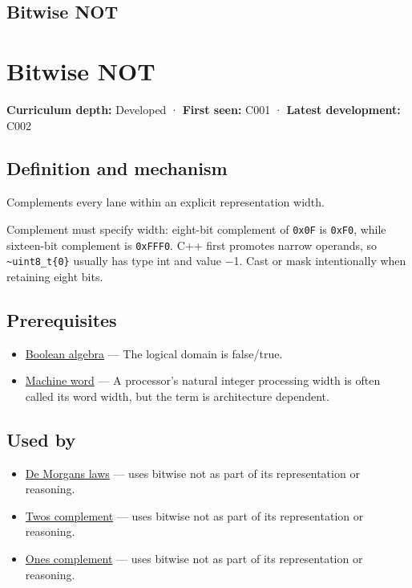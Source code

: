 \hypertarget{appendix-8f38927cfc54}{}
\section*{Bitwise NOT}
\chapter{Bitwise NOT}\label{appendix-8f38927cfc54-bitwise-not}

\textbf{Curriculum depth:} Developed · \textbf{First seen:} C001 · \textbf{Latest development:} C002

\section{Definition and mechanism}\label{appendix-8f38927cfc54-definition-and-mechanism}

Complements every lane within an explicit representation width.

Complement must specify width: eight-bit complement of \texttt{0x0F} is \texttt{0xF0}, while sixteen-bit complement is \texttt{0xFFF0}. C++ first promotes narrow operands, so \texttt{\textasciitilde{}uint8\_t\{0\}} usually has type int and value −1. Cast or mask intentionally when retaining eight bits.

\section{Prerequisites}\label{appendix-8f38927cfc54-prerequisites}

\begin{itemize}
\tightlist
\item
  \hyperref[appendix-24475e1596a8]{Boolean algebra} --- The logical domain is false/true.
\item
  \hyperref[appendix-d67a19507dc5]{Machine word} --- A processor's natural integer processing width is often called its word width, but the term is architecture dependent.
\end{itemize}

\section{Used by}\label{appendix-8f38927cfc54-used-by}

\begin{itemize}
\tightlist
\item
  \hyperref[appendix-9079d3659da4]{De Morgan\textquotesingle s laws} --- uses bitwise not as part of its representation or reasoning.
\item
  \hyperref[appendix-4fbc03d20829]{Two\textquotesingle s complement} --- uses bitwise not as part of its representation or reasoning.
\item
  \hyperref[appendix-03c678cd40b3]{One\textquotesingle s complement} --- uses bitwise not as part of its representation or reasoning.
\end{itemize}

